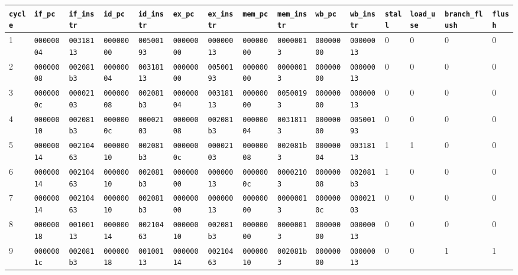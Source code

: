 \begin{tabular}{lllllllllllllll}
\hline
\texttt{cycle} & \texttt{if_pc} & \texttt{if_instr} & \texttt{id_pc} & \texttt{id_instr} & \texttt{ex_pc} & \texttt{ex_instr} & \texttt{mem_pc} & \texttt{mem_instr} & \texttt{wb_pc} & \texttt{wb_instr} & \texttt{stall} & \texttt{load_use} & \texttt{branch_flush} & \texttt{flush} \\
\hline
1 & \texttt{00000004} & \texttt{00318113} & \texttt{00000000} & \texttt{00500193} & \texttt{00000000} & \texttt{00000013} & \texttt{00000000} & \texttt{00000013} & \texttt{00000000} & \texttt{00000013} & 0 & 0 & 0 & 0 \\
2 & \texttt{00000008} & \texttt{002081b3} & \texttt{00000004} & \texttt{00318113} & \texttt{00000000} & \texttt{00500193} & \texttt{00000000} & \texttt{00000013} & \texttt{00000000} & \texttt{00000013} & 0 & 0 & 0 & 0 \\
3 & \texttt{0000000c} & \texttt{00002103} & \texttt{00000008} & \texttt{002081b3} & \texttt{00000004} & \texttt{00318113} & \texttt{00000000} & \texttt{00500193} & \texttt{00000000} & \texttt{00000013} & 0 & 0 & 0 & 0 \\
4 & \texttt{00000010} & \texttt{002081b3} & \texttt{0000000c} & \texttt{00002103} & \texttt{00000008} & \texttt{002081b3} & \texttt{00000004} & \texttt{00318113} & \texttt{00000000} & \texttt{00500193} & 0 & 0 & 0 & 0 \\
5 & \texttt{00000014} & \texttt{00210463} & \texttt{00000010} & \texttt{002081b3} & \texttt{0000000c} & \texttt{00002103} & \texttt{00000008} & \texttt{002081b3} & \texttt{00000004} & \texttt{00318113} & 1 & 1 & 0 & 0 \\
6 & \texttt{00000014} & \texttt{00210463} & \texttt{00000010} & \texttt{002081b3} & \texttt{00000000} & \texttt{00000013} & \texttt{0000000c} & \texttt{00002103} & \texttt{00000008} & \texttt{002081b3} & 1 & 0 & 0 & 0 \\
7 & \texttt{00000014} & \texttt{00210463} & \texttt{00000010} & \texttt{002081b3} & \texttt{00000000} & \texttt{00000013} & \texttt{00000000} & \texttt{00000013} & \texttt{0000000c} & \texttt{00002103} & 0 & 0 & 0 & 0 \\
8 & \texttt{00000018} & \texttt{00100113} & \texttt{00000014} & \texttt{00210463} & \texttt{00000010} & \texttt{002081b3} & \texttt{00000000} & \texttt{00000013} & \texttt{00000000} & \texttt{00000013} & 0 & 0 & 0 & 0 \\
9 & \texttt{0000001c} & \texttt{002081b3} & \texttt{00000018} & \texttt{00100113} & \texttt{00000014} & \texttt{00210463} & \texttt{00000010} & \texttt{002081b3} & \texttt{00000000} & \texttt{00000013} & 0 & 0 & 1 & 1 \\

\end{tabular}
